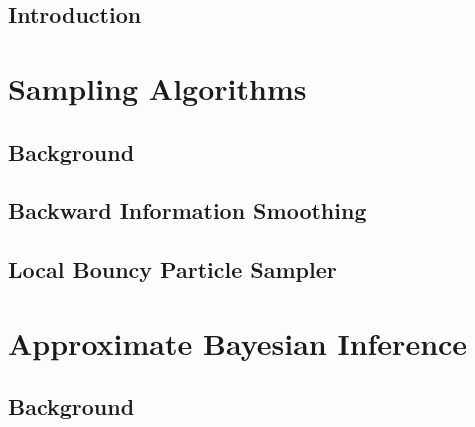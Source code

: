 
\singlespacing
\setcounter{tocdepth}{2}
\setcounter{secnumdepth}{2}
\iftoc\tableofcontents\fi
{}
\setcounter{page}{1}
\onehalfspacing

\raggedbottom



\doublespacing


\chapter{Introduction}\setcounter{page}{1}

\ifintro\fi

\part{Sampling Algorithms} %

\chapter{Background}

\ifbgs\fi

\chapter{Backward Information Smoothing}

\iftfs\fi

\chapter{Local Bouncy Particle Sampler}

\iflbps\fi

\part{Approximate Bayesian Inference} %

\chapter{Background}

